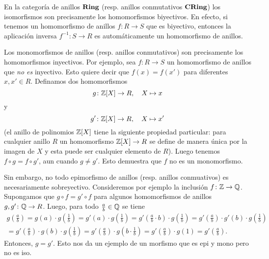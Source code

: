 \documentclass{article}
\numberwithin{equation}{section}
\theoremstyle{definition}
\begin{document}
\begin{ejemplo}
  En la categoría de anillos $\text{\bf Ring}$ (resp. anillos conmutativos
  $\text{\bf CRing}$) los isomorfismos son precisamente los homomorfismos
  biyectivos. En efecto, si tenemos un homomorfismo de anillos $f\colon R\to S$
  que es biyectivo, entonces la aplicación inversa $f^{-1}\colon S\to R$ es
  automáticamente un homomorfismo de anillos.

  Los monomorfismos de anillos (resp. anillos conmutativos) son precisamente los
  homomorfismos inyectivos. Por ejemplo, sea $f\colon R\to S$ un homomorfismo de
  anillos que \emph{no es} inyectivo. Esto quiere decir que $f (x) = f (x')$
  para diferentes $x,x'\in R$. Definamos dos homomorfismos
  $$g\colon \mathbb{Z} [X] \to R, \quad X\mapsto x$$
  y
  $$g'\colon \mathbb{Z} [X] \to R, \quad X\mapsto x'$$
  (el anillo de polinomios $\mathbb{Z} [X]$ tiene la siguiente propiedad particular:
  para cualquier anillo $R$ un homomorfismo $\mathbb{Z} [X] \to R$ se define de manera
  única por la imagen de $X$ y esta puede ser cualquier elemento de $R$). Luego
  tenemos $f\circ g = f\circ g'$, aun cuando $g\ne g'$. Esto demuestra que $f$
  no es un monomorfismo.

  Sin embargo, no todo epimorfismo de anillos (resp. anillos conmuativos) es
  necesariamente sobreyectivo. Consideremos por ejemplo la inclusión
  $f\colon \mathbb{Z} \to \mathbb{Q}$. Supongamos que $g\circ f = g'\circ f$ para algunos
  homomorfismos de anillos $g,g'\colon \mathbb{Q} \to R$. Luego, para todo
  $\frac{a}{b} \in \mathbb{Q}$ se tiene
  \begin{multline*}
    g \left(\frac{a}{b}\right) =
    g (a)\cdot g \left(\frac{1}{b}\right) =
    g' (a)\cdot g \left(\frac{1}{b}\right) =
    g' \left(\frac{a}{b}\cdot b\right)\cdot g \left(\frac{1}{b}\right) =
    g' \left(\frac{a}{b}\right)\cdot g' (b)\cdot g \left(\frac{1}{b}\right) \\
  = g' \left(\frac{a}{b}\right)\cdot g (b)\cdot g \left(\frac{1}{b}\right) =
    g' \left(\frac{a}{b}\right)\cdot g \left(b\cdot \frac{1}{b}\right) =
    g' \left(\frac{a}{b}\right)\cdot g (1) =
    g' \left(\frac{a}{b}\right).
  \end{multline*}
  Entonces, $g = g'$. Esto nos da un ejemplo de un morfismo que es epi y mono
  pero no es iso.
\end{ejemplo}
\end{document}
